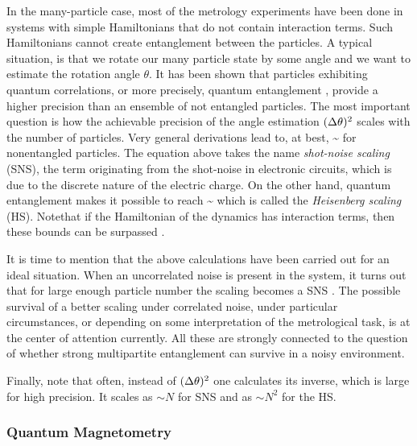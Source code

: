 In the many-particle case, most of the metrology experiments have been done in systems with simple Hamiltonians that do not contain interaction terms.
Such Hamiltonians cannot create entanglement between the particles.
A typical situation, is that we rotate our many particle state by some angle and we want to estimate the rotation angle $\theta$.
It has been shown that particles exhibiting quantum correlations, or more precisely, quantum entanglement \citep{Guehne2009, Luis2004}, provide a higher precision than an ensemble of not entangled particles.
The most important question is how the achievable precision of the angle estimation $(\Delta \theta )^2$ scales with the number of particles.
Very general derivations lead to, at best,
\be
  \label{eq:bg-shot-noise-scaling}
  \varian{\theta}\sim {}
\ee
for nonentangled particles.
The equation above takes the name \emph{shot-noise scaling} (SNS), the term originating from the shot-noise in electronic circuits, which is due to the discrete nature of the electric charge.
On the other hand, quantum entanglement makes it possible to reach
\be
  \label{eq:bg-heisenberg-scaling}
  \varian{\theta}\sim {}
\ee
which is called the \emph{Heisenberg scaling} (HS).
Notethat if the Hamiltonian of the dynamics has interaction terms, then these bounds can be surpassed \citep{Luis2004, Napolitano2011, Boixo2007, Braun2011, Roy2008, Choi2008, Rey2007}.

It is time to mention that the above calculations have been carried out for an ideal situation.
When an uncorrelated noise is present in the system, it turns out that for large enough particle number the scaling becomes a SNS \citep{}.
The possible survival of a better scaling under correlated noise, under particular circumstances, or depending on some interpretation of the metrological task, is at the center of attention currently.
All these are strongly connected to the question of whether strong multipartite entanglement can survive in a noisy environment.

Finally, note that often, instead of $(\Delta \theta )^2$ one calculates its inverse, which is large for high precision.
It scales as $\sim N$ for SNS and as $\sim N^2$ for the HS.

\subsubsection{Quantum Magnetometry}
\label{sec:bg-quantum-metro}

